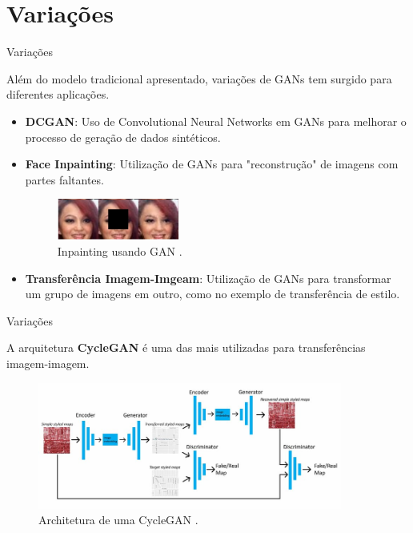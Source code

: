 \documentclass[10pt]{beamer}
\begin{document}
\section[Variações]{Variações}
\begin{frame}[fragile]{Variações}

	Além do modelo tradicional apresentado, variações de GANs
	tem surgido para diferentes aplicações.

	\begin{itemize}
		\item \textbf{DCGAN}: Uso de Convolutional Neural Networks
		em GANs para melhorar o processo de geração de dados sintéticos.
		\item \textbf{Face Inpainting}: Utilização de GANs para
		"reconstrução" de imagens com partes faltantes.

    \begin{figure}[H]
        \centering
        \includegraphics[width=4cm]{images/gan-inpainting.png}
        \caption{Inpainting usando GAN \citep{yeh2017}.}
    \end{figure}

		\item \textbf{Transferência Imagem-Imgeam}:
		Utilização de GANs para transformar um grupo de imagens
		em outro, como no exemplo de transferência de estilo.


	\end{itemize}

\end{frame}

\begin{frame}[fragile]{Variações}

	A arquitetura \textbf{CycleGAN} \citep{zhu2017} é uma das
	mais utilizadas para transferências imagem-imagem.
    \begin{figure}[H]
        \centering
        \includegraphics[width=10cm]{images/gan-cyclearch.jpg}
        \caption{Architetura de uma CycleGAN \citep{kang2019}.}
    \end{figure}

\end{frame}
\end{document}
